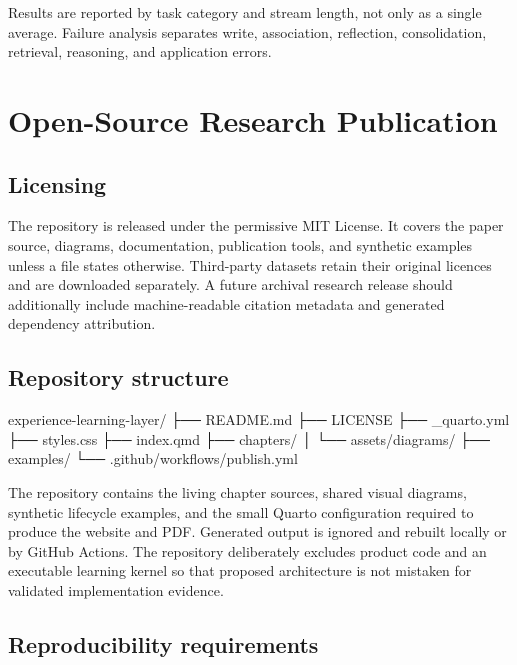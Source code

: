 \documentclass[
  english,
  a4paper,
  DIV=11,
  numbers=noendperiod]{scrreprt}
\newenvironment{Shaded}{\begin{snugshade}}{\end{snugshade}}
\newcommand{\NormalTok}[1]{\textcolor[rgb]{0.00,0.23,0.31}{#1}}
\begin{document}
Results are reported by task category and stream length, not only as a
single average. Failure analysis separates write, association,
reflection, consolidation, retrieval, reasoning, and application errors.


\chapter{Open-Source Research
Publication}\label{open-source-research-publication}

\section{Licensing}\label{licensing}

The repository is released under the permissive MIT License. It covers
the paper source, diagrams, documentation, publication tools, and
synthetic examples unless a file states otherwise. Third-party datasets
retain their original licences and are downloaded separately. A future
archival research release should additionally include machine-readable
citation metadata and generated dependency attribution.

\section{Repository structure}\label{repository-structure}

\begin{Shaded}
\begin{Highlighting}[]
\NormalTok{experience{-}learning{-}layer/}
\NormalTok{├── README.md}
\NormalTok{├── LICENSE}
\NormalTok{├── \_quarto.yml}
\NormalTok{├── styles.css}
\NormalTok{├── index.qmd}
\NormalTok{├── chapters/}
\NormalTok{│   └── assets/diagrams/}
\NormalTok{├── examples/}
\NormalTok{└── .github/workflows/publish.yml}
\end{Highlighting}
\end{Shaded}

The repository contains the living chapter sources, shared visual
diagrams, synthetic lifecycle examples, and the small Quarto
configuration required to produce the website and PDF. Generated output
is ignored and rebuilt locally or by GitHub Actions. The repository
deliberately excludes product code and an executable learning kernel so
that proposed architecture is not mistaken for validated implementation
evidence.

\section{Reproducibility
requirements}\label{reproducibility-requirements}
\end{document}
